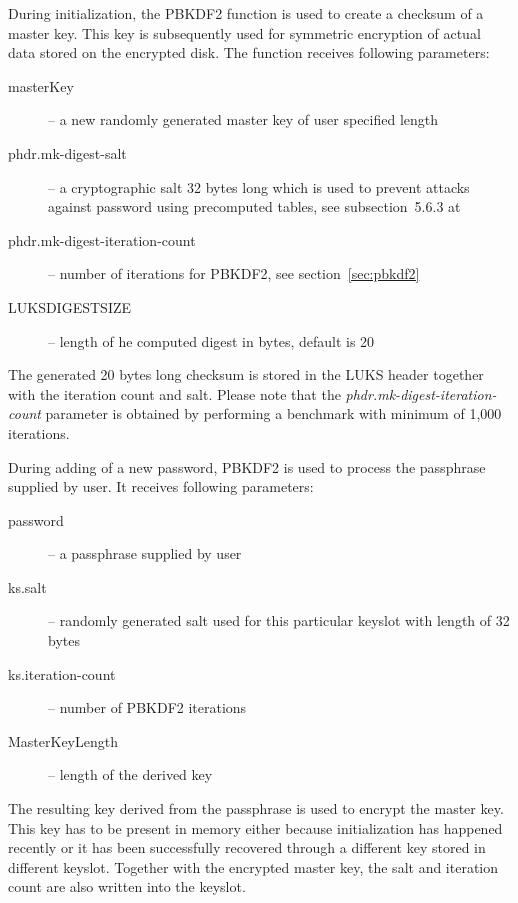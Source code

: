 \documentclass[nolof,digital]{fithesis3}
\begin{document}
During initialization, the PBKDF2 function is used to create a checksum of a master key. This key is subsequently used for symmetric encryption of actual data stored on the encrypted disk. The function receives following parameters:

\begin{description}
\item[masterKey] -- a new randomly generated master key of user specified length

\item[phdr.mk-digest-salt] -- a cryptographic salt 32 bytes long which is used to prevent attacks against password using precomputed tables, see subsection~5.6.3 at \parencite{itmc14}

\item[phdr.mk-digest-iteration-count] -- number of iterations for PBKDF2, see section~\ref{sec:pbkdf2}

\item[LUKS\-DIGEST\-SIZE] -- length of he computed digest in bytes, default is 20
\end{description}

The generated 20 bytes long checksum is stored in the LUKS header together with the iteration count and salt. Please note that the \emph{phdr.mk-digest-iteration-count} parameter is obtained by performing a benchmark with minimum of 1,000 iterations.

During adding of a new password, PBKDF2 is used to process the passphrase supplied by user. It receives following parameters:

\begin{description}
\item[password] -- a passphrase supplied by user

\item[ks.salt] -- randomly generated salt used for this particular keyslot with length of 32 bytes

\item[ks.iteration-count] -- number of PBKDF2 iterations

\item[MasterKeyLength] -- length of the derived key
\end{description}

The resulting key derived from the passphrase is used to encrypt the master key. This key has to be present in memory either because initialization has happened recently or it has been successfully recovered through a different key stored in different keyslot. Together with the encrypted master key, the salt and iteration count are also written into the keyslot.
\end{document}
